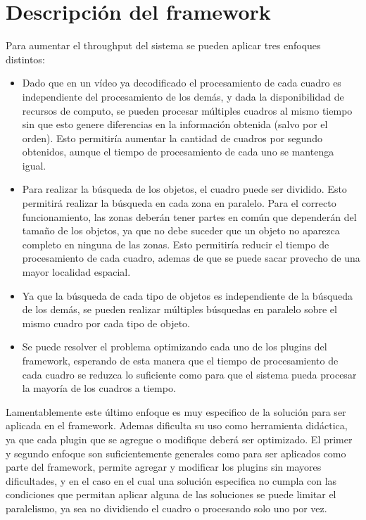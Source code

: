 
\section{Descripción del framework}

Para aumentar el throughput del sistema se pueden aplicar tres enfoques distintos:

\begin{itemize}

	\item 	Dado que en un vídeo ya decodificado el procesamiento de cada
		cuadro es independiente del procesamiento de los demás, y dada
		la disponibilidad de recursos de computo, se pueden procesar
		múltiples cuadros al mismo tiempo sin que esto genere
		diferencias en la información obtenida (salvo por el orden).
		Esto permitiría aumentar la cantidad de cuadros por segundo
		obtenidos, aunque el tiempo de procesamiento de cada uno se
		mantenga igual.

	\item	Para realizar la búsqueda de los objetos, el cuadro puede ser
		dividido. Esto permitirá realizar la búsqueda en cada zona en
		paralelo. Para el correcto funcionamiento, las zonas deberán
		tener partes en común que dependerán del tamaño de los objetos,
		ya que no debe suceder que un objeto no aparezca completo en
		ninguna de las zonas. Esto permitiría reducir el tiempo de
		procesamiento de cada cuadro, ademas de que se puede sacar
		provecho de una mayor localidad espacial.

	\item	Ya que la búsqueda de cada tipo de objetos es independiente de
		la búsqueda de los demás, se pueden realizar múltiples búsquedas
		en paralelo sobre el mismo cuadro por cada tipo de objeto.

	\item	Se puede resolver el problema optimizando cada uno de los
		plugins del framework, esperando de esta manera que el tiempo de
		procesamiento de cada cuadro se reduzca lo suficiente como para
		que el sistema pueda procesar la mayoría de los cuadros a
		tiempo.

\end{itemize}

Lamentablemente este último enfoque es muy especifico de la solución para ser
aplicada en el framework. Ademas dificulta su uso como herramienta didáctica, ya
que cada plugin que se agregue o modifique deberá ser optimizado. El primer y
segundo enfoque son suficientemente generales como para ser aplicados como parte
del framework, permite agregar y modificar los plugins sin mayores dificultades,
y en el caso en el cual una solución especifica no cumpla con las condiciones
que permitan aplicar alguna de las soluciones se puede limitar el paralelismo,
ya sea no dividiendo el cuadro o procesando solo uno por vez.

